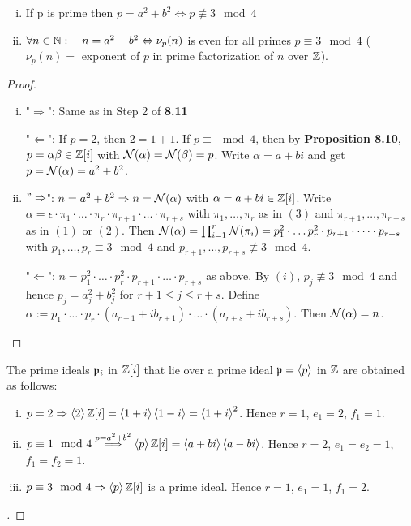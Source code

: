 \begin{Kor}[Fermat]
	\begin{enumerate}[(i)]
		\item If p is prime then $p = a^2 + b^2 \Leftrightarrow p \not\equiv 3 \mod 4$
		
		\item $\forall n \in \mathbb{N}: \quad n = a^2+b^2 \Leftrightarrow \nu_p(n) $ is even for all primes $p \equiv 3 \mod 4$ ($\nu_p(n)=$ exponent of $p$ in prime factorization of $n$ over $\mathbb{Z}$).
	\end{enumerate}
\end{Kor}
\begin{proof}
	\begin{enumerate}[(i)]
		\item "$\Rightarrow$": Same as in Step 2 of \textbf{8.11}
		
		"$\Leftarrow$": If $p = 2$, then $2 = 1+1$. If $p \equiv \mod 4$, then by \textbf{Proposition 8.10}, $p = \alpha\beta \in \mathbb{Z}[i]$ with $\operatorname{\mathcal{N}}(\alpha) = \operatorname{\mathcal{N}}(\beta) = p$. Write $\alpha = a +bi$ and get $p = \operatorname{\mathcal{N}}(\alpha) = a^2 + b^2$.
		
		\item $"\Rightarrow$": $n = a^2+b^2 \Rightarrow n = \operatorname{\mathcal{N}}(\alpha)$ with $\alpha = a+bi \in \mathbb{Z}[i]$. Write $\alpha = \epsilon \cdot \pi_1 \cdot \dots \cdot \pi_r \cdot \pi_{r+1}\cdot \dots \cdot \pi_{r+s}$ with $\pi_1, \dots, \pi_r$ as in $(3)$ and $\pi_{r+1}, \dots, \pi_{r+s}$ as in $(1)$ or $(2)$. Then $\operatorname{\mathcal{N}}(\alpha) = \prod_{i=1}^r \operatorname{\mathcal{N}}(\pi_i) = p_1^2 \cdot \dots p_r^2 \cdot p_{r+1} \cdot \dots \cdot p_{r+s}$ with $p_1, \dots, p_r \equiv 3 \mod 4$ and $p_{r+1}, \dots, p_{r+s} \not\equiv 3 \mod 4$.
		
		"$\Leftarrow$": $n = p_1^2 \cdot \dots \cdot p_r^2 \cdot p_{r+1} \cdot \dots \cdot p_{r+s}$ as above. By $(i)$, $p_j \not\equiv 3 \mod 4$ and hence $p_j = a_j^2+b_j^2$ for $r+1 \leq j \leq r+s$. Define $\alpha := p_1 \cdot \dots \cdot p_r \cdot (a_{r+1}+ib_{r+1})  \cdot \dots \cdot (a_{r+s} + ib_{r+s})$. Then $\operatorname{\mathcal{N}}(\alpha) = n$.
	\end{enumerate}
\end{proof}

\begin{Kor}
	The prime ideals $\mathfrak{p}_i$ in $\mathbb{Z}[i]$ that lie over a prime ideal $\mathfrak{p} = \left\langle {p} \right\rangle$ in $\mathbb{Z}$ are obtained as follows:
	\begin{enumerate}[(i)]
		\item $p = 2 \Rightarrow \left\langle {2} \right\rangle\mathbb{Z}[i] = \left\langle {1+i} \right\rangle\left\langle {1-i} \right\rangle = \left\langle {1+i} \right\rangle^2$. Hence $r = 1$, $e_1 = 2$, $f_1 = 1$.
		
		\item $p \equiv 1 \mod 4 \overset{p = a^2+b^2}{\Longrightarrow} \left\langle {p} \right\rangle\mathbb{Z}[i] = \left\langle {a+bi} \right\rangle\left\langle {a-bi} \right\rangle$. Hence $r = 2$, $e_1 = e_2 =  1$, $f_1 = f_2 = 1$.
		
		\item $p \equiv 3 \mod 4 \Rightarrow \left\langle {p} \right\rangle\mathbb{Z}[i]$ is a prime ideal. Hence $r = 1$, $e_1 = 1$, $f_1 = 2$.
	\end{enumerate}
\end{Kor}
\begin{proof}[]
\end{proof}

